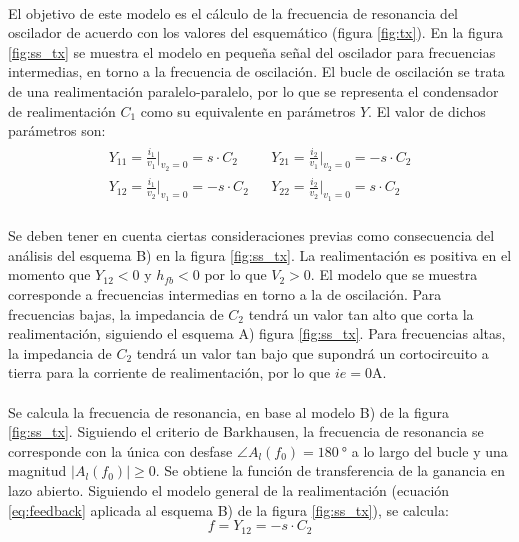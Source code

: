 \paragraph{}
El objetivo de este modelo es el cálculo de la frecuencia de resonancia del oscilador de acuerdo con los valores del esquemático (figura \ref{fig:tx}). En la figura \ref{fig:ss_tx} se muestra el modelo en pequeña señal del oscilador para frecuencias intermedias, en torno a la frecuencia de oscilaci\'on. El bucle de oscilaci\'on se trata de una realimentación paralelo-paralelo, por lo que se representa el condensador de realimentación $C_1$ como su equivalente en par\'ametros $Y$. El valor de dichos par\'ametros son:
\[
\begin{array}{rl} 
      \begin{array}{l}
	 Y_{11} = \frac{i_1}{v_1}|_{v_2 = 0} = s \cdot C_2 \\
	 Y_{12} = \frac{i_1}{v_2}|_{v_1 = 0} = -s \cdot C_2 
      \end{array}
      &
      \begin{array}{l}
	 Y_{21} = \frac{i_2}{v_1}|_{v_2 = 0} = -s \cdot C_2 \\
	 Y_{22} = \frac{i_2}{v_2}|_{v_1 = 0} = s \cdot C_2 
      \end{array}
\end{array}
\]
\paragraph{}
Se deben tener en cuenta ciertas consideraciones previas como consecuencia del an\'alisis del esquema B) en la figura \ref{fig:ss_tx}. La realimentaci\'on es positiva en el momento que $Y_{12}<0$ y $h_{fb}<0$ por lo que $V_2>0$. El modelo que se muestra corresponde a frecuencias intermedias en torno a la de oscilaci\'on. Para frecuencias bajas, la impedancia de $C_2$ tendrá un valor tan alto que corta la realimentación, siguiendo el esquema A) figura \ref{fig:ss_tx}. 
Para frecuencias altas, la impedancia de $C_2$ tendr\'a un valor tan bajo que supondr\'a un cortocircuito a tierra para la corriente de realimentaci\'on, por lo que $ie = 0 \unit{\ampere}$.
\paragraph{}
Se calcula la frecuencia de resonancia, en base al modelo B) de la figura \ref{fig:ss_tx}. Siguiendo el criterio de Barkhausen, la frecuencia de resonancia se corresponde con la única con desfase $\angle A_l(f_0) = \SI{180}{\degree}$ a lo largo del bucle y una magnitud $|A_l(f_0)|\ge 0$. Se obtiene la funci\'on de transferencia de la ganancia en lazo abierto.
Siguiendo el modelo general de la realimentaci\'on (ecuaci\'on \ref{eq:feedback} aplicada al esquema B) de la figura \ref{fig:ss_tx}), se calcula: 
\begin{equation}
f = Y_{12} = -s \cdot C_2
\end{equation}
